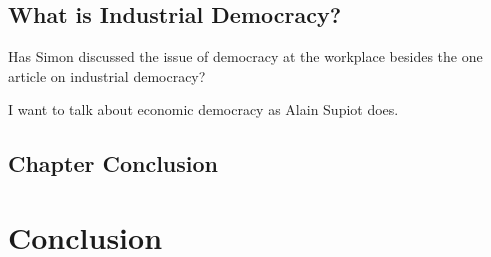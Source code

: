 \documentclass[version=last,draft=true,paper=A4,portrait,twoside=true,twocolumn=true,headinclude=false,footinclude=false,fontsize=10,BCOR=20mm,DIV=13,pagesize=auto,titlepage=false,mpinclude=false,open=right,chapterprefix=true,numbers=autoendperiod,headsepline=false,parskip=false]{scrbook}
\begin{document}
\section{What is Industrial Democracy?}
\label{sec:org4b96d0f}
Has Simon discussed the issue of democracy at the workplace besides the one
article on industrial democracy?

I want to talk about economic democracy as Alain Supiot does.  

\printbibliography[heading=none,keyword=chapter-2.2]
\section{Chapter Conclusion}
\label{sec:orgf787f9c}
\printbibliography[heading=none,keyword=chapter-2.3]
\chapter{Conclusion}
\label{sec:orgca4f913}
\lipsum
\end{document}
